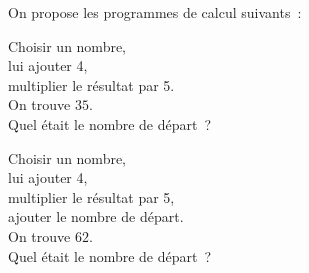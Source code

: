 \activite On propose les programmes de calcul suivants~:\\

\begin{minipage}{0.25\textwidth}
\noindent Choisir un nombre,\\
lui ajouter 4,\\
multiplier le résultat par 5.\\[1em]
On trouve $35$.\\[1em]
Quel était le nombre de départ~?\\
\end{minipage}
\begin{minipage}{0.25\textwidth}
\noindent Choisir un nombre,\\
lui ajouter 4,\\
multiplier le résultat par 5,\\
ajouter le nombre de départ.\\[1em]
On trouve $62$.\\[1em]
Quel était le nombre de départ~?
\end{minipage}

